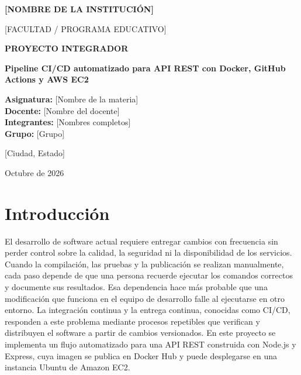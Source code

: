 \documentclass[12pt,letterpaper]{article}
\begin{document}
\begin{titlepage}
\centering
\vspace*{1.2cm}
{\Large\bfseries [NOMBRE DE LA INSTITUCIÓN]\par}
\vspace{0.5cm}
{\large [FACULTAD / PROGRAMA EDUCATIVO]\par}
\vspace{2cm}
{\Large\bfseries PROYECTO INTEGRADOR\par}
\vspace{0.5cm}
{\LARGE\bfseries Pipeline CI/CD automatizado para API REST con Docker, GitHub Actions y AWS EC2\par}
\vspace{2cm}
\begin{flushleft}
\textbf{Asignatura:} [Nombre de la materia]\\[0.35cm]
\textbf{Docente:} [Nombre del docente]\\[0.35cm]
\textbf{Integrantes:} [Nombres completos]\\[0.35cm]
\textbf{Grupo:} [Grupo]\\
\end{flushleft}
\vfill
{\large [Ciudad, Estado]\par}
{\large Octubre de 2026\par}
\end{titlepage}

\hypersetup{pageanchor=true}
\tableofcontents
\newpage
{}

\section{Introducción}
El desarrollo de software actual requiere entregar cambios con frecuencia sin perder control sobre la calidad, la seguridad ni la disponibilidad de los servicios. Cuando la compilación, las pruebas y la publicación se realizan manualmente, cada paso depende de que una persona recuerde ejecutar los comandos correctos y documente sus resultados. Esa dependencia hace más probable que una modificación que funciona en el equipo de desarrollo falle al ejecutarse en otro entorno. La integración continua y la entrega continua, conocidas como CI/CD, responden a este problema mediante procesos repetibles que verifican y distribuyen el software a partir de cambios versionados. En este proyecto se implementa un flujo automatizado para una API REST construida con Node.js y Express, cuya imagen se publica en Docker Hub y puede desplegarse en una instancia Ubuntu de Amazon EC2.
\end{document}
